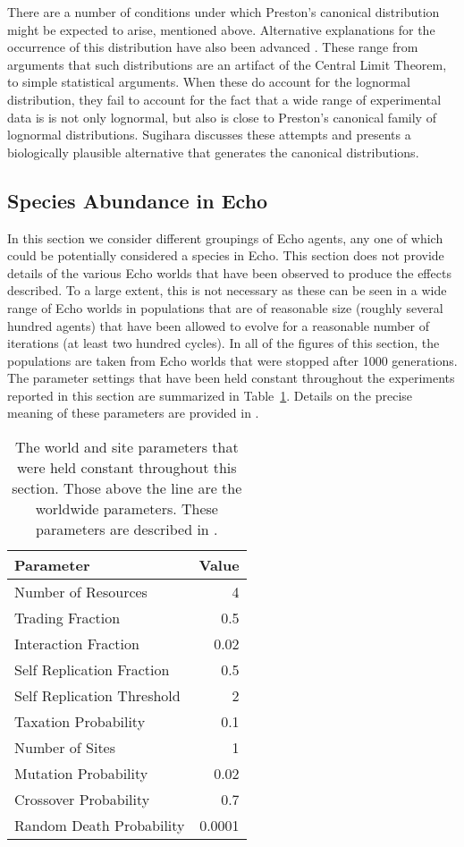 There are a number of conditions under which Preston's canonical
distribution might be expected to arise, mentioned above.  Alternative
explanations for the occurrence of this distribution have also been
advanced \cite{Hogg90a}.  These range from arguments that such
distributions are an artifact of the Central Limit Theorem, to simple
statistical arguments.  When these do account for the lognormal
distribution, they fail to account for the fact that a wide range of
experimental data is is not only lognormal, but also is close to
Preston's canonical family of lognormal distributions. Sugihara
\cite{Sugihara80} discusses these attempts and presents a biologically
plausible alternative that generates the canonical distributions.

\subsection{Species Abundance in Echo}

In this section we consider different groupings of Echo agents, any
one of which could be potentially considered a species in Echo.  This
section does not provide details of the various Echo worlds that have
been observed to produce the effects described. To a large extent,
this is not necessary as these can be seen in a wide range of Echo
worlds in populations that are of reasonable size (roughly several
hundred agents) that have been allowed to evolve for a reasonable
number of iterations (at least two hundred cycles).  In all of the
figures of this section, the populations are taken from Echo worlds
that were stopped after 1000 generations.  The parameter settings that
have been held constant throughout the experiments reported in this
section are summarized in Table~\ref{tab:echo-params}.  Details on the
precise meaning of these parameters are provided in
\cite{JonesForrest93}.

\begin{table}
\begin{center}
\begin{tabular}{|l|r|} \hline
Parameter  & Value  \\
\hline
Number of Resources & 4   \\
Trading Fraction    & 0.5 \\
Interaction Fraction & 0.02 \\
Self Replication Fraction & 0.5 \\
Self Replication Threshold & 2 \\
Taxation Probability & 0.1 \\
Number of Sites & 1 \\
\hline
Mutation Probability & 0.02 \\
Crossover Probability & 0.7 \\
Random Death Probability & 0.0001 \\
\hline
\end{tabular}
\end{center}
\caption[hey]{The world and site parameters that were held constant
throughout this section. Those above the line are the worldwide
parameters. These parameters are described in \cite{JonesForrest93}.
\label{tab:echo-params}}
\end{table}

